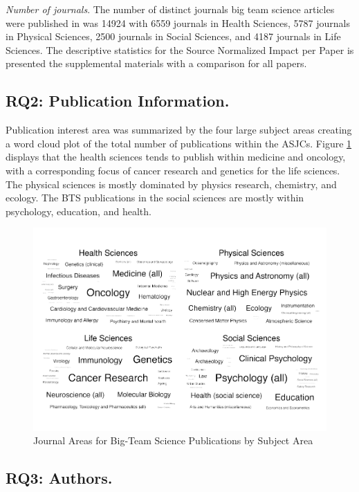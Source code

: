 \documentclass[
  man,floatsintext]{apa6}
\begin{document}
\emph{Number of journals}. The number of distinct journals big team science articles were published
in was 14924 with 6559 journals in Health Sciences,
5787 journals in Physical Sciences, 2500
journals in Social Sciences, and 4187 journals in Life
Sciences. The descriptive statistics for the Source Normalized Impact
per Paper is presented the supplemental materials with a comparison for all papers.

\hypertarget{rq2-publication-information.-1}{%
\subsection{RQ2: Publication Information.}\label{rq2-publication-information.-1}}

Publication interest area was summarized by the four large subject areas creating a word cloud plot of the total number of publications within the ASJCs. Figure \ref{fig:fig-clouds} displays that the health sciences tends to publish within medicine and oncology, with a corresponding focus of cancer research and genetics for the life sciences. The physical sciences is mostly dominated by physics research, chemistry, and ecology. The BTS publications in the social sciences are mostly within psychology, education, and health.

\begin{figure}
\centering
\includegraphics{manuscript_scopus_files/figure-latex/fig-clouds-1.pdf}
\caption{\label{fig:fig-clouds}Journal Areas for Big-Team Science Publications by Subject Area}
\end{figure}

\hypertarget{rq3-authors.}{%
\subsection{RQ3: Authors.}\label{rq3-authors.}}
\end{document}
